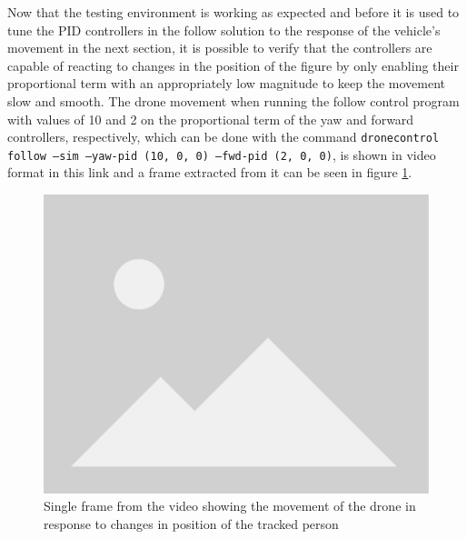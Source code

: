 Now that the testing environment is working as expected and before it is used to tune the PID controllers in the follow solution to the response of the vehicle's movement in the next section, it is possible to verify that the controllers are capable of reacting to changes in the position of the figure by only enabling their proportional term with an appropriately low magnitude to keep the movement slow and smooth.
The drone movement when running the follow control program with values of 10 and 2 on the proportional term of the yaw and forward controllers, respectively, which can be done with the command \texttt{dronecontrol follow --sim --yaw-pid (10, 0, 0) --fwd-pid (2, 0, 0)}, is shown in video format in  this link and a frame extracted from it can be seen in figure \ref{fig:airsim-test-follow}.


\begin{figure}
  \centering
  \includegraphics[width=.6\textwidth, keepaspectratio]{img/placeholder.png}
  \caption{Single frame from the video showing the movement of the drone in response to changes in position of the tracked person}\label{fig:airsim-test-follow}
\end{figure}